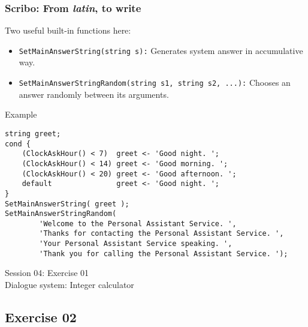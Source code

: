 \documentclass[11pt]{beamer}
\begin{document}
\begin{frame}[fragile]
\frametitle{Scribo: From \emph{latin}, to write}
Two useful built-in functions here:
\begin{itemize}
	\item \texttt{SetMainAnswerString(string s):} Generates system answer in accumulative way.
	\item \texttt{SetMainAnswerStringRandom(string s1, string s2, ...):} Chooses an answer randomly between its arguments.
\end{itemize}
\begin{block}{Example}
\tiny
\begin{lstlisting}[language=lekta]
string greet;
cond {
	(ClockAskHour() < 7)  greet <- 'Good night. ';
	(ClockAskHour() < 14) greet <- 'Good morning. ';
	(ClockAskHour() < 20) greet <- 'Good afternoon. ';
	default               greet <- 'Good night. ';
}
SetMainAnswerString( greet );
SetMainAnswerStringRandom( 
		'Welcome to the Personal Assistant Service. ',
		'Thanks for contacting the Personal Assistant Service. ',
		'Your Personal Assistant Service speaking. ',
		'Thank you for calling the Personal Assistant Service. ');
\end{lstlisting}
\end{block}
\end{frame}

\begin{frame}[fragile]
\Huge
\begin{center}
Session 04: Exercise 01\\
Dialogue system: Integer calculator
\end{center}
\end{frame}

\subsection{Exercise 02}
\end{document}
